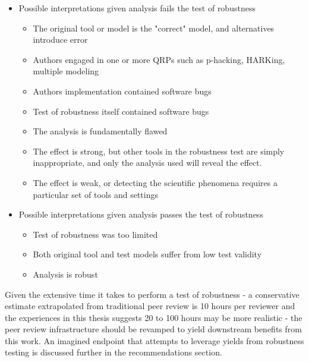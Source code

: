 \documentclass{drexelthesis}
\begin{document}
\begin{itemize}
	\item Possible interpretations given analysis fails the test of robustness

\begin{itemize}
	\item The original tool or model is the "correct" model, and alternatives introduce error

	\item Authors engaged in one or more QRPs such as p-hacking, HARKing, multiple modeling

	\item Authors implementation contained software bugs

	\item Test of robustness itself contained software bugs

	\item The analysis is fundamentally flawed

	\item The effect is strong, but other tools in the robustness test are simply inappropriate, and only the analysis used will reveal the effect.

	\item The effect is weak, or detecting the scientific phenomena requires a particular set of tools and settings

\end{itemize}
	\item Possible interpretations given analysis passes the test of robustness

\begin{itemize}
	\item Test of robustness was too limited

	\item Both original tool and test models suffer from low test validity 

	\item Analysis is robust

\end{itemize}
\end{itemize}
Given the extensive time it takes to perform a test of robustness - a conservative estimate extrapolated from traditional peer review is 10 hours per reviewer and the experiences in this thesis suggests 20 to 100 hours may be more realistic - the peer review infrastructure should be revamped to yield downstream benefits from this work. An imagined endpoint that attempts to leverage yields from robustness testing is discussed further in the recommendations section.
\end{document}
